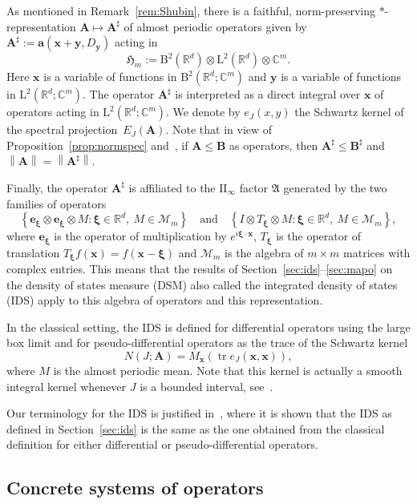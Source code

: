 \documentclass[AHL,Unicode,longabstracts,published]{cedram}
\newcommand{\RB}{\mathrm{B}}
\newcommand{\RL}{\mathrm{L}}
\newcommand{\rmII}{\mathrm{II}}
\newcommand{\R}{\mathbb R}
\newcommand{\C}{\mathbb C}
\newcommand{\CM}{\mathcal{M}}
\newcommand{\bxi}{\boldsymbol \xi}
\newcommand{\ba}{\mathbf a}
\newcommand{\BA}{\mathbf A}
\newcommand{\BB}{\mathbf B}
\newcommand{\bx}{\mathbf x}
\newcommand{\be}{\mathbf e}
\newcommand{\by}{\mathbf y}
\newcommand{\FA}{\mathfrak A}
\newcommand{\FH}{\mathfrak H}
\newcommand{\set}[1]{\left\{ #1 \right\}}
\newcommand{\norm}[1]{\left\| #1 \right\|}
\begin{document}
As mentioned in Remark~\ref{rem:Shubin}, there is a faithful, norm-preserving $*$-representation $\BA \mapsto \BA^\sharp$ of almost periodic operators given by $\BA^\sharp := \ba(\bx + \by,D_\by)$
acting in
\[
\FH_m := \RB^2\left(\R^d\right) \otimes \RL^2\left(\R^d\right) \otimes \C^m.
\]
Here $\bx$ is a variable of functions in $\RB^2(\R^d;\C^m)$ and $\by$ is a variable of functions in $\RL^2(\R^d;\C^m)$. The operator $\BA^\sharp$ is interpreted as a direct integral over $\bx$ of operators acting in $\RL^2(\R^d;\C^m)$. We denote by $e_J(x,y)$ the Schwartz kernel of the spectral projection~$E_J(\BA)$. Note that in view of Proposition~\ref{prop:normspec} and~\cite{CoburnMoyerSinger}, if $\BA \le \BB$ as operators, then $\BA^\sharp \le \BB^\sharp$ and $\norm \BA = \norm{\BA^\sharp}$.

Finally, the operator $\BA^\sharp$ is affiliated to the $\rmII_\infty$ factor $\FA$ generated by the two families of operators
\[
\set{\be_{\bxi} \otimes \be_{\bxi}\otimes M: \bxi \in \R^d,\ M\in \CM_m} \quad \text{and} \quad \set{I \otimes T_{\bxi}\otimes M: \bxi \in \R^d,\ M\in \CM_m},
\]
where $\be_{\bxi}$ is the operator of multiplication by $e^{i \bxi \cdot \bx}$, $T_{{\bxi}}$ is the operator of translation $T_{\bxi} f(\bx) = f(\bx - \bxi)$ and $\CM_m$ is the algebra of $m\times m$ matrices with complex entries. This means that the results of Section~\ref{sec:ids}--\ref{sec:mapo} on the density of states measure (DSM) also called the integrated density of states (IDS) apply to this algebra of operators and this representation.

In the classical setting, the IDS is defined for differential operators using the large box limit and for pseudo-differential operators as the trace of the Schwartz kernel
\begin{equation}
N(J;\BA) = M_\bx(\operatorname{tr} e_J(\bx,\bx)),
\end{equation}
where $M$ is the almost periodic mean. Note that this kernel is actually a smooth integral kernel whenever $J$ is a bounded interval, see~\cite{ParSht2016}.

Our terminology for the IDS is justified in~\cite[Remark~3.1]{Shubin1979}, where it is shown that the IDS as defined in Section~\ref{sec:ids} is the same as the one obtained from the classical definition for either differential or pseudo-differential operators.

\subsection{Concrete systems of operators}
\end{document}
